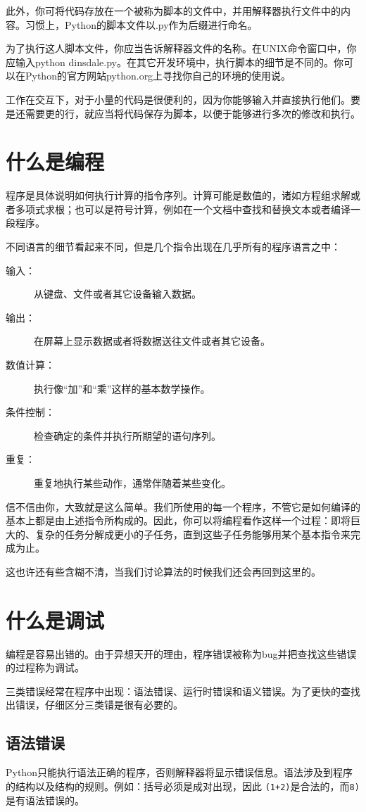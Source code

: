 此外，你可将代码存放在一个被称为脚本的文件中，并用解释器执行文件中的内容。习惯上，Python的脚本文件以.py作为后缀进行命名。

为了执行这人脚本文件，你应当告诉解释器文件的名称。在UNIX命令窗口中，你应输入python dinsdale.py。在其它开发环境中，执行脚本的细节是不同的。你可以在Python的官方网站python.org上寻找你自己的环境的使用说。

工作在交互下，对于小量的代码是很便利的，因为你能够输入并直接执行他们。要是还需要更的行，就应当将代码保存为脚本，以便于能够进行多次的修改和执行。

\section{什么是编程}
程序是具体说明如何执行计算的指令序列。计算可能是数值的，诸如方程组求解或者多项式求根；也可以是符号计算，例如在一个文档中查找和替换文本或者编译一段程序。

不同语言的细节看起来不同，但是几个指令出现在几乎所有的程序语言之中：
\begin{description}
\item[输入：]从键盘、文件或者其它设备输入数据。
\item[输出：]在屏幕上显示数据或者将数据送往文件或者其它设备。
\item[数值计算：]执行像“加”和“乘”这样的基本数学操作。
\item[条件控制：]检查确定的条件并执行所期望的语句序列。
\item[重复：]重复地执行某些动作，通常伴随着某些变化。
\end{description}

信不信由你，大致就是这么简单。我们所使用的每一个程序，不管它是如何编译的基本上都是由上述指令所构成的。因此，你可以将编程看作这样一个过程：即将巨大的、复杂的任务分解成更小的子任务，直到这些子任务能够用某个基本指令来完成为止。

这也许还有些含糊不清，当我们讨论算法的时候我们还会再回到这里的。
\section{什么是调试}
编程是容易出错的。由于异想天开的理由，程序错误被称为bug并把查找这些错误的过程称为调试。

三类错误经常在程序中出现：语法错误、运行时错误和语义错误。为了更快的查找出错误，仔细区分三类错是很有必要的。

\subsection{语法错误}
Python只能执行语法正确的程序，否则解释器将显示错误信息。语法涉及到程序的结构以及结构的规则。例如：括号必须是成对出现，因此 \lstinline$(1+2)$是合法的，而\lstinline$8)$是有语法错误的。

